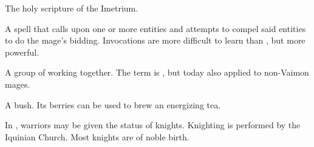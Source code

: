 \begin{gloss}
\begin{comment}
\paragraph{The \Imetriad}
\end{comment}
\gitemthe{\Imetriad}
The holy scripture of the Imetrium.







\begin{comment}
\paragraph{invocation}
\end{comment}
A spell that calls upon one or more entities and attempts to compel said entities to do the mage's bidding. 
Invocations are more difficult to learn than , but more powerful. 








\begin{comment}
\paragraph{\ishrah{} (plural \ishroth)}
\end{comment}
\gitem[\ishroth]{\ishrah}
A group of  working together. 
The term is , but today also applied to non-Vaimon mages. 







\begin{comment}
\paragraph{\jiliba}
\end{comment}
\gitem{\jiliba}
\index{\jiliba}
A bush. 
Its berries can be used to brew an energizing tea. 







\begin{comment}
\paragraph{knights}
\end{comment}
In \Velcad{},  warriors may be given the status of knights. 
Knighting is performed by the Iquinian Church. 
Most knights are of noble birth.








\end{gloss}

